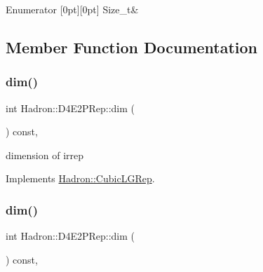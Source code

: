 \begin{DoxyEnumFields}{Enumerator}
[0pt][0pt]{}\mbox{\label{structHadron_1_1D4E2PRep_a5533ecfc24d2dc62ee75a2549af49e8da64a39cf698903d8a11cf0f02c3c9f36a}} 
Size\+\_\+t&\\
\hline

\end{DoxyEnumFields}


\subsection{Member Function Documentation}
\mbox{\label{structHadron_1_1D4E2PRep_a840b6fdd348949a1a1c0fa8c2f9f9ecd}} 
\subsubsection{\texorpdfstring{dim()}{dim()}\hspace{0.1cm}{\footnotesize\ttfamily [1/3]}}
{\footnotesize\ttfamily int Hadron\+::\+D4\+E2\+P\+Rep\+::dim (\begin{DoxyParamCaption}{ }\end{DoxyParamCaption}) const\hspace{0.3cm}{\ttfamily [inline]}, {\ttfamily [virtual]}}

dimension of irrep 

Implements \mbox{\hyperlink{structHadron_1_1CubicLGRep_a3acbaea26503ed64f20df693a48e4cdd}{Hadron\+::\+Cubic\+L\+G\+Rep}}.

\mbox{\label{structHadron_1_1D4E2PRep_a840b6fdd348949a1a1c0fa8c2f9f9ecd}} 
\subsubsection{\texorpdfstring{dim()}{dim()}\hspace{0.1cm}{\footnotesize\ttfamily [2/3]}}
{\footnotesize\ttfamily int Hadron\+::\+D4\+E2\+P\+Rep\+::dim (\begin{DoxyParamCaption}{ }\end{DoxyParamCaption}) const\hspace{0.3cm}{\ttfamily [inline]}, {\ttfamily [virtual]}}

